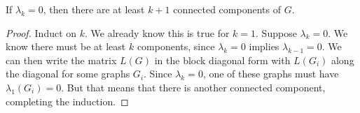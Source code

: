 \begin{corollary}
If \(\lambda_{k}=0\), then there are at least \(k+1\) connected components of \(G\).
\end{corollary}

\begin{proof}
Induct on \(k\).
We already know this is true for \(k=1\).
Suppose \(\lambda_{k}=0\).
We know there must be at least \(k\) components, since \(\lambda_{k}=0\) implies \(\lambda_{k-1}=0\).
We can then write the matrix \(L\left(G\right)\) in the block diagonal form with \(L\left(G_{i}\right)\) along the diagonal for some graphs \(G_{i}\).
Since \(\lambda_{k}=0\), one of these graphs must have \(\lambda_{1}\left(G_{i}\right)=0\).
But that means that there is another connected component, completing the induction.
\end{proof}
